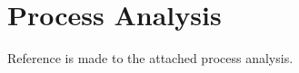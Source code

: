 \chapter{Process Analysis}\label{ch:process-analysis}

Reference is made to the attached process analysis.
